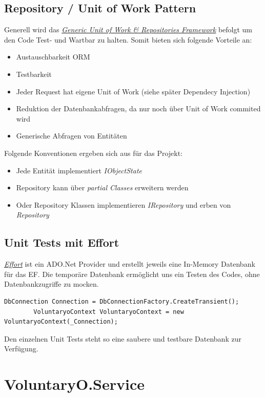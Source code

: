 	\subsection{Repository / Unit of Work Pattern}
	Generell wird das \href{https://genericunitofworkandrepositories.codeplex.com/}{\textit{Generic Unit of Work \& Repositories Framework}} befolgt um den Code Test- und Wartbar zu halten. Somit bieten sich folgende Vorteile an:
	\\\begin{itemize}	
		\item Austauschbarkeit ORM
		\item Testbarkeit
		\item Jeder Request hat eigene Unit of Work (siehe später Dependecy Injection)
		\item Reduktion der Datenbankabfragen, da nur noch über Unit of Work commited wird
		\item Generische Abfragen von Entitäten
	\end{itemize}
	Folgende Konventionen ergeben sich aus für das Projekt:
	\\\begin{itemize}
		\item Jede Entität implementiert \textit{IObjectState}
		\item Repository kann über \textit{partial Classes} erweitern werden
		\item Oder Repository Klassen implementieren \textit{IRepository} und erben von \textit{Repository}
	\end{itemize}

	\subsection{Unit Tests mit Effort}
	\href{https://effort.codeplex.com/}{\textit{Effort}} ist ein ADO.Net Provider und erstellt jeweils eine In-Memory Datenbank für das EF. Die temporäre Datenbank ermöglicht uns ein Testen des Codes, ohne Datenbankzugriffe zu mocken.
	\begin{lstlisting}[language=CSharp, caption=Verwendung Effort für Unit Tests in EffortTest.cs, label=lst:effortunittest, firstnumber=1]
		DbConnection Connection = DbConnectionFactory.CreateTransient();
		VoluntaryoContext VoluntaryoContext = new VoluntaryoContext(_Connection);
    \end{lstlisting}
    Den einzelnen Unit Tests steht so eine saubere und testbare Datenbank zur Verfügung.


\section{VoluntaryO.Service}



